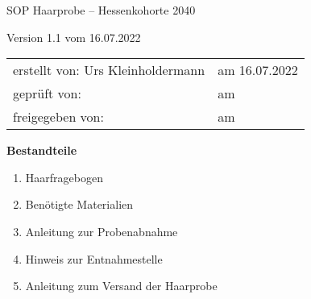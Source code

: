 \begin{center}
  {\Huge SOP Haarprobe -- Hessenkohorte 2040}
  
  Version 1.1 vom 16.07.2022 
\end{center}

\vspace*{2cm}

\begin{tabular}{@{}p{}l}
  erstellt von: Urs Kleinholdermann & am 16.07.2022 \\
  geprüft von: & am \\
  freigegeben von: & am \\
\end{tabular}

\vspace*{2cm}

{\Large\textbf{Bestandteile}}

\begin{enumerate} 
 \item Haarfragebogen 
 \item Benötigte Materialien
 \item Anleitung zur Probenabnahme
 \item Hinweis zur Entnahmestelle
 \item Anleitung zum Versand der Haarprobe
\end{enumerate}
    



